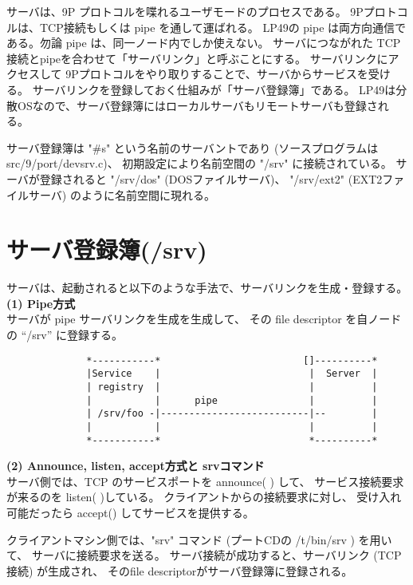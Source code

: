       サーバは、9P プロトコルを喋れるユーザモードのプロセスである。 
      9Pプロトコルは、TCP接続もしくは pipe を通して運ばれる。
      LP49の pipe は両方向通信である。勿論 pipe は、同一ノード内でしか使えない。
      サーバにつながれた TCP接続とpipeを合わせて「サーバリンク」と呼ぶことにする。
      サーバリンクにアクセスして 9Pプロトコルをやり取りすることで、サーバからサービスを受ける。
    サーバリンクを登録しておく仕組みが「サーバ登録簿」である。
    LP49は分散OSなので、サーバ登録簿にはローカルサーバもリモートサーバも登録される。

    サーバ登録簿は "\#s" という名前のサーバントであり (ソースプログラムは src/9/port/devsrv.c)、
    初期設定により名前空間の "/srv" に接続されている。
    サーバが登録されると "/srv/dos" (DOSファイルサーバ)、
    "/srv/ext2" (EXT2ファイルサーバ) のように名前空間に現れる。


\section{サーバ登録簿(/srv)}
      サーバは、起動されると以下のような手法で、サーバリンクを生成・登録する。\\

 {\bf (1) Pipe方式} \\

      サーバが  pipe サーバリンクを生成を生成して、
      その file descriptor を自ノードの ``/srv'' に登録する。

\begin{verbatim}
              *-----------*                         []----------*     
              |Service    |                          |  Server  |
              | registry  |                          |          |
              |           |      pipe                |          |
              | /srv/foo -|--------------------------|--        |            
              |           |                          |          |
              *-----------*                          *----------*             
\end{verbatim}


{\bf  (2) Announce, listen, accept方式と srvコマンド}\\

       サーバ側では、TCP のサービスポートを announce( ) して、
      サービス接続要求が来るのを listen( )している。
      クライアントからの接続要求に対し、
      受け入れ可能だったら accept() してサービスを提供する。

       クライアントマシン側では、"srv" コマンド (プートCDの /t/bin/srv ) を用いて、
       サーバに接続要求を送る。
       サーバ接続が成功すると、サーバリンク (TCP接続) が生成され、
       そのfile descriptorがサーバ登録簿に登録される。

